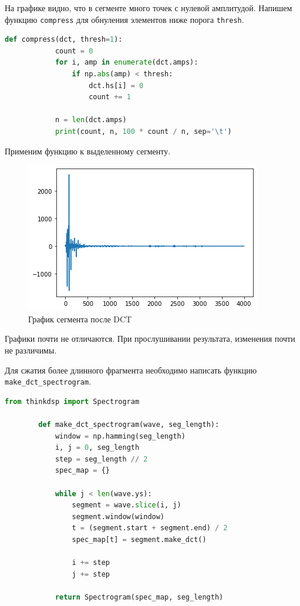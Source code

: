 \documentclass[a4paper, 14pt]{extarticle}
\begin{document}
    На графике видно, что в сегменте много точек с нулевой амплитудой.
    Напишем функцию \texttt{compress} для обнуления элементов ниже порога \texttt{thresh}.

    \begin{lstlisting}[language=Python, caption= Функция compress, label={lst:compress}]
        def compress(dct, thresh=1):
            count = 0
            for i, amp in enumerate(dct.amps):
                if np.abs(amp) < thresh:
                    dct.hs[i] = 0
                    count += 1

            n = len(dct.amps)
            print(count, n, 100 * count / n, sep='\t')
    \end{lstlisting}

    Применим функцию к выделенному сегменту.

    \begin{figure}[H]
        \centering
        \includegraphics[width=0.8\linewidth]{segment_after_dct}
        \caption{График сегмента после DCT}
        \label{fig:segment_after_dct}
    \end{figure}

    Графики почти не отличаются.
    При прослушивании результата, изменения почти не различимы.

    Для сжатия более длинного фрагмента необходимо написать функцию \texttt{make\_dct\_spectrogram}.

    \begin{lstlisting}[language=Python, caption= Функция make\_dct\_spectrogram, label={lst:make_dct_spectrogram}]
        from thinkdsp import Spectrogram

        def make_dct_spectrogram(wave, seg_length):
            window = np.hamming(seg_length)
            i, j = 0, seg_length
            step = seg_length // 2
            spec_map = {}

            while j < len(wave.ys):
                segment = wave.slice(i, j)
                segment.window(window)
                t = (segment.start + segment.end) / 2
                spec_map[t] = segment.make_dct()

                i += step
                j += step

            return Spectrogram(spec_map, seg_length)
    \end{lstlisting}
\end{document}
